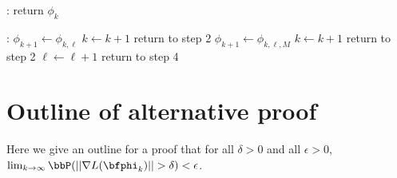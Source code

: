 \begin{algorithm}
\begin{algorithmic}
:
    \State return $\phi_{k}$
\EndIf

:
    \State $\phi_{k+1} \gets \phi_{k,\ell}$
    \State $k \gets k+1$
    \State return to step 2
    \State $\phi_{k+1} \gets \phi_{k,\ell,M}$
    \State $k \gets k+1$
    \State return to step 2
\Else
    \State $\ell \gets \ell+1$
    \State return to step 4
\EndIf

\end{algorithmic}
\end{algorithm}

\section{Outline of alternative proof}

Here we give an outline for a proof that for all $\delta > 0$ and all $\epsilon > 0$, $\lim_{k \to \infty} \bbP(||\nabla L (\bfphi_k) || > \delta) < \epsilon$.

